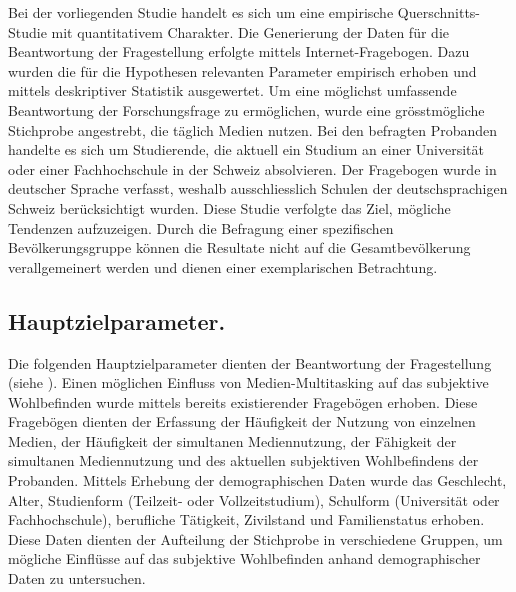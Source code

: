%
%
\glsresetall
\let\raggedsection\centering
{}
\setcounter{chapter}{2}
\setcounter{section}{0}
\let\raggedsection\raggedright 
\label{section.studiendesign}
Bei der vorliegenden Studie handelt es sich um eine empirische Querschnitts-Studie mit quantitativem Charakter. Die Generierung der Daten für die Beantwortung der Fragestellung erfolgte mittels Internet-Fragebogen. Dazu wurden die für die Hypothesen relevanten Parameter empirisch erhoben und mittels deskriptiver Statistik ausgewertet. Um eine möglichst umfassende Beantwortung der Forschungsfrage zu ermöglichen, wurde eine grösstmögliche Stichprobe angestrebt, die täglich Medien nutzen. Bei den befragten Probanden handelte es sich um Studierende, die aktuell ein Studium an einer Universität oder einer Fachhochschule in der Schweiz absolvieren. Der Fragebogen wurde in deutscher Sprache verfasst, weshalb ausschliesslich Schulen der deutschsprachigen Schweiz berücksichtigt wurden. Diese Studie verfolgte das Ziel, mögliche Tendenzen aufzuzeigen. Durch die Befragung einer spezifischen Bevölkerungsgruppe können die Resultate nicht auf die Gesamtbevölkerung verallgemeinert werden und dienen einer exemplarischen Betrachtung.

\subsection{Hauptzielparameter.}\label{subsection.hauptzielparameter}
Die folgenden Hauptzielparameter dienten der Beantwortung der Fragestellung (siehe ). Einen möglichen Einfluss von Medien-Multitasking auf das subjektive Wohlbefinden wurde mittels bereits existierender Fragebögen erhoben. Diese Fragebögen dienten der Erfassung der Häufigkeit der Nutzung von einzelnen Medien, der Häufigkeit der simultanen Mediennutzung, der Fähigkeit der simultanen Mediennutzung und des aktuellen subjektiven Wohlbefindens der Probanden. Mittels Erhebung der demographischen Daten wurde das Geschlecht, Alter, Studienform (Teilzeit- oder Vollzeitstudium), Schulform (Universität oder Fachhochschule), berufliche Tätigkeit, Zivilstand und Familienstatus erhoben. Diese Daten dienten der Aufteilung der Stichprobe in verschiedene Gruppen, um mögliche Einflüsse auf das subjektive Wohlbefinden anhand demographischer Daten zu untersuchen.

